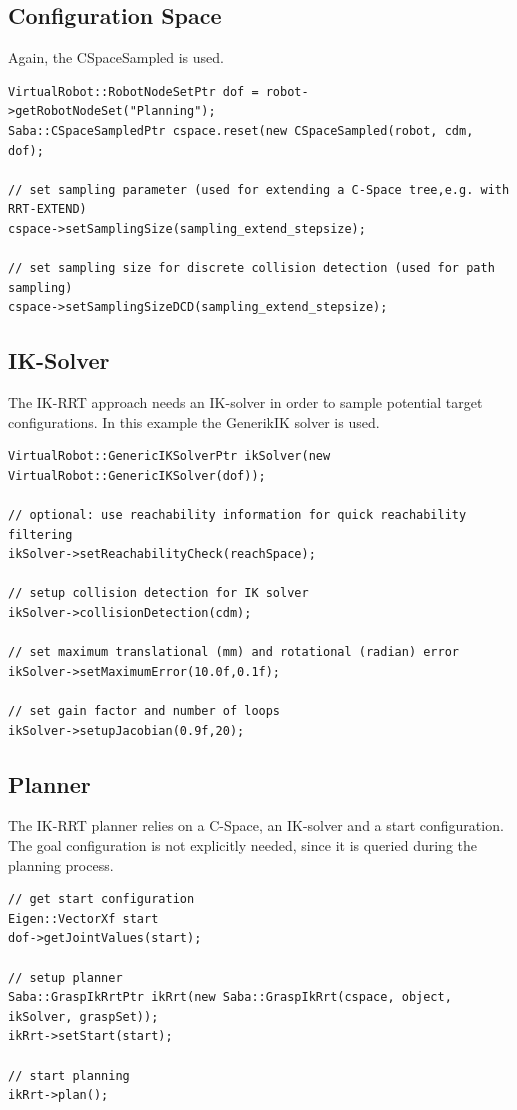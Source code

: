 \documentclass{book}
\begin{document}
\subsection{Configuration Space}
Again, the CSpaceSampled is used.  
\begin{lstlisting}
VirtualRobot::RobotNodeSetPtr dof = robot->getRobotNodeSet("Planning");
Saba::CSpaceSampledPtr cspace.reset(new CSpaceSampled(robot, cdm, dof);

// set sampling parameter (used for extending a C-Space tree,e.g. with RRT-EXTEND)
cspace->setSamplingSize(sampling_extend_stepsize);

// set sampling size for discrete collision detection (used for path sampling)
cspace->setSamplingSizeDCD(sampling_extend_stepsize);
\end{lstlisting}
\subsection{IK-Solver}
The IK-RRT approach needs an IK-solver in order to sample potential target configurations. In this example the GenerikIK solver is used.   
\begin{lstlisting}
VirtualRobot::GenericIKSolverPtr ikSolver(new VirtualRobot::GenericIKSolver(dof));

// optional: use reachability information for quick reachability filtering
ikSolver->setReachabilityCheck(reachSpace);

// setup collision detection for IK solver
ikSolver->collisionDetection(cdm);

// set maximum translational (mm) and rotational (radian) error 
ikSolver->setMaximumError(10.0f,0.1f);

// set gain factor and number of loops 
ikSolver->setupJacobian(0.9f,20);
\end{lstlisting}
\subsection{Planner}
The IK-RRT planner relies on a C-Space, an IK-solver and a start configuration. The goal configuration is not explicitly needed, since it is queried during the planning process.  
\begin{lstlisting}
// get start configuration
Eigen::VectorXf start
dof->getJointValues(start);

// setup planner
Saba::GraspIkRrtPtr ikRrt(new Saba::GraspIkRrt(cspace, object, ikSolver, graspSet));
ikRrt->setStart(start);

// start planning
ikRrt->plan();
\end{lstlisting}
\end{document}

